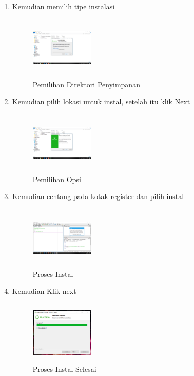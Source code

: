\begin{enumerate}
    \item Kemudian memilih tipe instalasi
    \begin{figure}[!htbp]
        \centering
        \includegraphics[width=3cm,height=3cm]{figures/4.png}
        \caption{Pemilihan Direktori Penyimpanan}
        \label{Directory}
        \end{figure}

    \item Kemudian pilih lokasi untuk instal, setelah itu klik Next
    \begin{figure}[!htbp]
        \centering
        \includegraphics[width=3cm,height=3cm]{figures/5.png}
        \caption{Pemilihan Opsi}
        \label{opsi}
        \end{figure}

    \item Kemudian centang pada kotak register dan pilih instal
    \begin{figure}[!htbp]
        \centering
        \includegraphics[width=3cm,height=3cm]{figures/6.png}
        \caption{Proses Instal}
        \label{Proses}
        \end{figure}

    \item Kemudian Klik next
    \begin{figure}[!htbp]
        \centering
        \includegraphics[width=3cm,height=3cm]{figures/7.png}
        \caption{Proses Instal Selesai}
        \label{Proses}
        \end{figure}


\end{enumerate}
